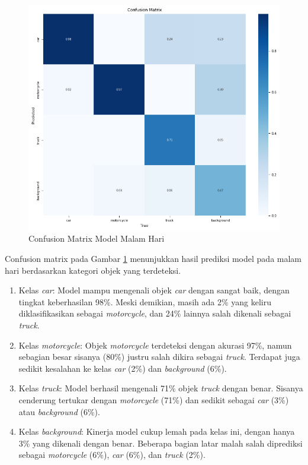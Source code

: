\begin{figure} [H] \centering
  \includegraphics[scale=0.8]{bab4/confusion_malam.png}
  \caption{Confusion Matrix Model Malam Hari}
  \label{fig:confusion matrix malam}
\end{figure}
\vspace{-10pt}
Confusion matrix pada Gambar \ref{fig:confusion matrix malam} menunjukkan hasil prediksi model pada malam hari berdasarkan kategori objek yang terdeteksi.

\begin{enumerate}[nosep]
\item Kelas \emph{car}:
Model mampu mengenali objek \emph{car} dengan sangat baik, dengan tingkat keberhasilan 98\%. Meski demikian, masih ada 2\% yang keliru diklasifikasikan sebagai \emph{motorcycle}, dan 24\% lainnya salah dikenali sebagai \emph{truck}.

\item Kelas \emph{motorcycle}:  
Objek \emph{motorcycle} terdeteksi dengan akurasi 97\%, namun sebagian besar sisanya (80\%) justru salah dikira sebagai \emph{truck}. Terdapat juga sedikit kesalahan ke kelas \emph{car} (2\%) dan \emph{background} (6\%).

\item Kelas \emph{truck}:  
Model berhasil mengenali 71\% objek \emph{truck} dengan benar. Sisanya cenderung tertukar dengan \emph{motorcycle} (71\%) dan sedikit sebagai \emph{car} (3\%) atau \emph{background} (6\%).

\item Kelas \emph{background}:  
Kinerja model cukup lemah pada kelas ini, dengan hanya 3\% yang dikenali dengan benar. Beberapa bagian latar malah salah diprediksi sebagai \emph{motorcycle} (6\%), \emph{car} (6\%), dan \emph{truck} (2\%).
\end{enumerate}


